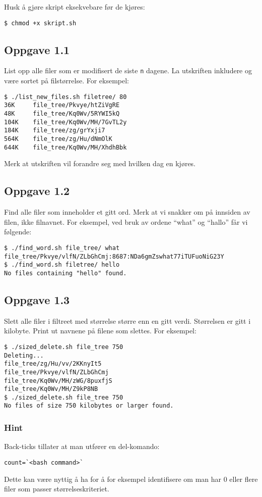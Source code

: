 \documentclass{article}
\begin{document}
Husk å gjøre skript eksekvebare før de kjøres:
\begin{Verbatim}[fontsize=\small, frame=single]
$ chmod +x skript.sh
\end{Verbatim}

\newpage

\subsection*{Oppgave 1.1}
List opp alle filer som er modifisert de siste \verb;n; dagene.
La utskriften inkludere og være sortet på filstørrelse.
For eksempel:
\begin{Verbatim}[fontsize=\small, frame=single]
$ ./list_new_files.sh filetree/ 80
36K     file_tree/Pkvye/htZiVgRE
48K     file_tree/Kq0Wv/5RYWI5kQ
104K    file_tree/Kq0Wv/MH/7GvTL2y
184K    file_tree/zg/grYxji7
564K    file_tree/zg/Hu/dNmOlK
644K    file_tree/Kq0Wv/MH/XhdhBbk
\end{Verbatim}
Merk at utskriften vil forandre seg med hvilken dag en kjøres.

\subsection*{Oppgave 1.2}
Find alle filer som inneholder et gitt ord.
Merk at vi snakker om på innsiden av filen, ikke filnavnet.
For eksempel, ved bruk av ordene ``what'' og ``hallo'' får vi
følgende:
\begin{Verbatim}[fontsize=\small, frame=single]
$ ./find_word.sh file_tree/ what
file_tree/Pkvye/vlfN/ZLbGhCmj:8687:NDa6gmZswhat77iTUFuoNiG23Y
$ ./find_word.sh filetree/ hello
No files containing "hello" found.
\end{Verbatim}

\subsection*{Oppgave 1.3}
Slett alle filer i filtreet med størrelse større enn en gitt verdi.
Størrelsen er gitt i kilobyte.
Print ut navnene på filene som slettes.
For eksempel:
\begin{Verbatim}[fontsize=\small, frame=single]
$ ./sized_delete.sh file_tree 750
Deleting...
file_tree/zg/Hu/vv/2KKnyIt5
file_tree/Pkvye/vlfN/ZLbGhCmj
file_tree/Kq0Wv/MH/zWG/8puxfjS
file_tree/Kq0Wv/MH/Z9kP8NB
$ ./sized_delete.sh file_tree 750
No files of size 750 kilobytes or larger found.
\end{Verbatim}

\subsubsection*{Hint}
Back-ticks tillater at man utfører en del-komando:
\begin{Verbatim}[fontsize=\small, frame=single]
count=`<bash command>`
\end{Verbatim}
Dette kan være nyttig å ha for å for eksempel identifisere om man
har 0 eller flere filer som passer størrelseskriteriet.
\end{document}
